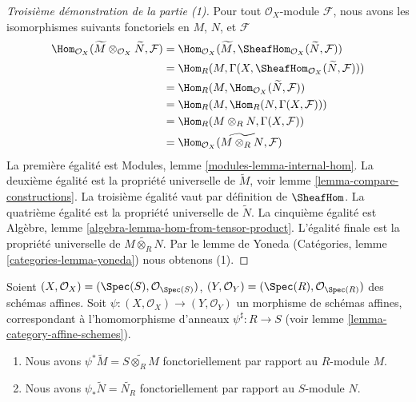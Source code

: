 \begin{proof}[Troisième démonstration de la partie (1)]
Pour tout $\mathcal{O}_X$-module $\mathcal{F}$,
nous avons les isomorphismes suivants fonctoriels en $M$, $N$, et $\mathcal{F}$
\begin{align*}
\Hom_{\mathcal{O}_X}(\widetilde{M} \otimes _{\mathcal{O} _X} \widetilde{N},
\mathcal{F}) &
=
\Hom_{\mathcal{O}_X}(\widetilde{M},
\SheafHom_{\mathcal{O} _X} (\widetilde{N}, \mathcal{F})) \\ &
=
\Hom_R(M, \Gamma(X,
\SheafHom_{\mathcal{O}_X}(\widetilde{N}, \mathcal{F}))) \\ &
=
\Hom_R(M, \Hom_{\mathcal{O}_X}(\widetilde{N}, \mathcal{F})) \\ &
=
\Hom_R(M, \Hom_R(N, \Gamma(X, \mathcal{F}))) \\
& =
\Hom_R(M \otimes_R N, \Gamma(X, \mathcal{F})) \\
& =
\Hom_{\mathcal{O}_X}(\widetilde{M \otimes_R N}, \mathcal{F})
\end{align*}
La première égalité est Modules, lemme \ref{modules-lemma-internal-hom}. La
deuxième égalité est la propriété universelle de $\widetilde{M}$, voir
lemme \ref{lemma-compare-constructions}. La troisième égalité vaut par
définition de $\SheafHom$. La quatrième égalité est la propriété universelle
de $\widetilde{N}$. La cinquième égalité est
Algèbre, lemme \ref{algebra-lemma-hom-from-tensor-product}.
L'égalité finale est la propriété universelle de
$\widetilde{M \otimes_R N}$. Par
le lemme de Yoneda (Catégories, lemme \ref{categories-lemma-yoneda}) nous
obtenons (1).
\end{proof}

\begin{lemma}
\label{lemma-widetilde-pullback}
Soient
$(X, \mathcal{O}_X) = (\Spec(S), \mathcal{O}_{\Spec(S)})$,
$(Y, \mathcal{O}_Y) = (\Spec(R), \mathcal{O}_{\Spec(R)})$ des
schémas affines.
Soit $\psi : (X, \mathcal{O}_X) \to (Y, \mathcal{O}_Y)$ un morphisme
de schémas affines, correspondant à l'homomorphisme d'anneaux
$\psi^\sharp : R \to S$ (voir lemme \ref{lemma-category-affine-schemes}).
\begin{enumerate}
\item Nous avons $\psi^* \widetilde M = \widetilde{S \otimes_R M}$
fonctoriellement par rapport au $R$-module $M$.
\item Nous avons $\psi_* \widetilde N = \widetilde{N_R}$ fonctoriellement par
rapport au $S$-module $N$.
\end{enumerate}
\end{lemma}

